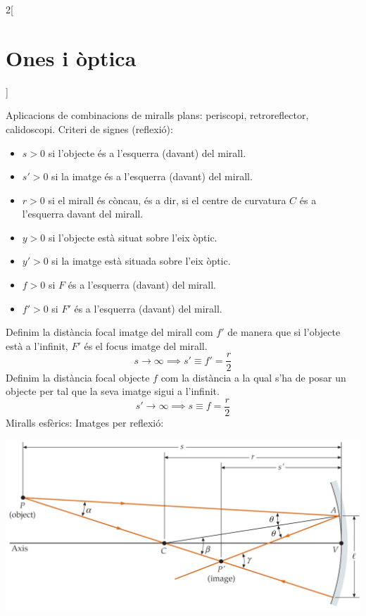 \documentclass[../../../main.tex]{subfiles}
\begin{document}
\begin{multicols}{2}[\section{Ones i òptica}]
\begin{minipage}{\linewidth}
  \end{minipage}
  Aplicacions de combinacions de miralls plans: periscopi, retroreflector, calidoscopi.\newline
  Criteri de signes (reflexió):
  \begin{itemize}
    \item $s>0$ si l'objecte és a l'esquerra (davant) del mirall.
    \item $s'>0$ si la imatge és a l'esquerra (davant) del mirall.
    \item $r>0$ si el mirall és còncau, és a dir, si el centre de curvatura $C$ és a l'esquerra davant del mirall.
    \item $y>0$ si l'objecte està situat sobre l'eix òptic.
    \item $y'>0$ si la imatge està situada sobre l'eix òptic.
    \item $f>0$ si $F$ és a l'esquerra (davant) del mirall.
    \item $f'>0$ si $F'$ és a l'esquerra (davant) del mirall.
  \end{itemize}
  Definim la distància focal imatge del mirall com $f'$ de manera que si l'objecte està a l'infinit, $F'$ és el focus imatge del mirall. $$s\to\infty\implies s'\equiv f'=\frac{r}{2}$$ Definim la distància focal objecte $f$ com la distància a la qual s'ha de posar un objecte per tal que la seva imatge sigui a l'infinit. $$s'\to\infty\implies s\equiv f=\frac{r}{2}$$
  Miralls esfèrics:\newline
  Imatges per reflexió:\newline
  \begin{minipage}{\linewidth}
    \centering
    \includegraphics[width=\linewidth]{Physics/1st/Waves_and_optics/Images/conc.jpg}

\end{minipage}
\end{multicols}
\end{document}
